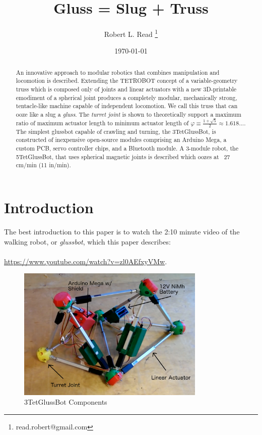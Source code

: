 \documentclass[11pt]{article}
\title{Gluss = Slug + Truss}
\author{Robert L. Read
  \thanks{read.robert@gmail.com}
}
\affil{Founder, Public Invention, an educational non-profit.}
\date{\today}
\begin{document}
\maketitle


\begin{abstract}
  An innovative approach to modular robotics that combines manipulation and locomotion is described.
  Extending the TETROBOT\cite{sanderson1996modular,lee2002dynamic,lee1999dynamics} concept of a variable-geometry
  truss which is composed only of joints and linear actuators
  with a new 3D-printable emodiment of a
  spherical joint\cite{song2003spherical}
  produces a completely modular, mechanically strong, tentacle-like machine capable of independent locomotion.
  We call this truss that can ooze like a slug a \emph{gluss}.
  The \emph{turret joint} is shown to theoretically support a maximum ratio of maximum actuator length to
  minimum actuator length of  $\varphi \equiv \frac{1 + \sqrt{5}}{2} \approx 1.618...$.
  The simplest glussbot capable of crawling and turning, the 3TetGlussBot, is constructed of
  inexpensive open-source modules comprising an Arduino Mega, a custom PCB, servo controller chips, and a Bluetooth module.
  A 3-module robot, the 5TetGlussBot, that uses spherical magnetic joints is described which oozes at ~27 cm/min (11 in/min).
\end{abstract}


\section{Introduction}

The best introduction to this paper is to watch the 2:10 minute video of the
walking robot, or \emph{glussbot}, which this paper describes:\\
\\
\indent \href{https://www.youtube.com/watch?v=zl0AEfxyVMw}{https://www.youtube.com/watch?v=zl0AEfxyVMw}.\\

\begin{figure}[H]
  \centering
    \includegraphics[width=0.8\textwidth]{figures/3TetGlussBotPhotoAnnotated.png}
    \caption[3TetGlussBot Components]{3TetGlussBot Components}
      \label{annotated}
\end{figure}
\end{document}
